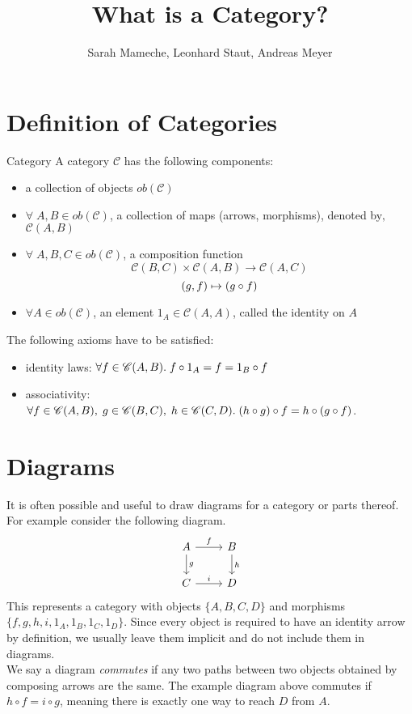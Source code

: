 
\def\pathToRoot{../}

\usepackage{charter}
\selectfont


\title{What is a Category?}
\author{Sarah Mameche, Leonhard Staut, Andreas Meyer}
\maketitle

\section {Definition of Categories}
\begin{definition}{Category}
	A category $\mathscr{C}$ has the following components:
	\begin{itemize}
		\item a collection of objects $ob(\mathscr{C})$
		\item $\forall \; A, B \in ob(\mathscr{C})$, a collection of maps (arrows, morphisms), denoted by‚ $\mathscr{C}(A, B)$
		\item $\forall \; A, B, C \in ob(\mathscr{C})$, a composition function
		\[\mathscr{C}(B, C) \times \mathscr{C}(A, B) \rightarrow  \mathscr{C}(A, C)
		\]		\[ (g,f) \mapsto (g \mathbin{\circ} f)
		\]
		\item $\forall A \in ob(\mathscr{C})$, an element $1_A \in \mathscr{C}(A, A)$, called the identity on $A$ 
 	\end{itemize}
 The following axioms have to be satisfied:
 \begin{itemize}
 	\item identity laws: $\forall f \in \mathscr{C}(A, B). \; f \mathbin{\circ} 1_A = f = 1_B \mathbin{\circ} f$ 
 	\item associativity: $\forall f \in \mathscr{C}(A, B), \; g \in \mathscr{C}(B, C), \; h \in \mathscr{C}(C, D). \; (h \mathbin{\circ} g) \mathbin{\circ} f = h \mathbin{\circ} (g \mathbin{\circ} f) $.
 \end{itemize}
\end{definition}


\section {Diagrams}
It is often possible and useful to draw diagrams for a category or parts thereof.
For example consider the following diagram.
\[
  \begin{tikzcd}
    A \arrow{r}{f} \arrow{d}{g} & B \arrow{d}{h} \\
    C \arrow{r}{i}              & D 
  \end{tikzcd}
\]
This represents a category with objects $\{A, B, C, D\}$ and
morphisms $\{f, g, h, i, 1_A, 1_B, 1_C, 1_D \}$.
Since every object is required to have an identity arrow by definition,
we usually leave them implicit and do not include them in diagrams.\\
We say a diagram \emph{commutes} if any two paths between two objects
obtained by composing arrows are the same.
The example diagram above commutes if $ h \circ f = i \circ g $, meaning there is
exactly one way to reach $D$ from $A$.


